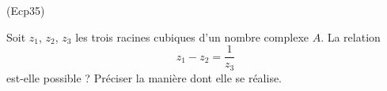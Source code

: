 \begin{tiny}(Ecp35)\end{tiny} Soit $z_1$, $z_2$, $z_3$ les trois racines cubiques d'un nombre complexe $A$. La relation
\begin{displaymath}
 z_1 - z_2 = \frac{1}{z_3}
\end{displaymath}
est-elle possible ? Préciser la manière dont elle se réalise.